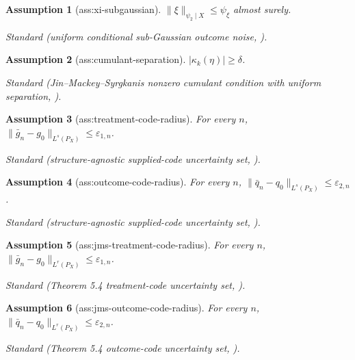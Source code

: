 \documentclass{article}
\newtheorem{assumption}{Assumption}
\begin{document}
\begin{assumption}[ass:xi-subgaussian]\label{ass:xi-subgaussian}
\(\|\xi\|_{\psi_2\mid X}\le\psi_{\xi}\) almost surely.
\par\smallskip\noindent\emph{Standard} (uniform conditional sub-Gaussian outcome noise, \cite{JinMackeySyrgkanis2025}).
\end{assumption}

\begin{assumption}[ass:cumulant-separation]\label{ass:cumulant-separation}
\(|\kappa_k(\eta)|\ge\delta\).
\par\smallskip\noindent\emph{Standard} (Jin--Mackey--Syrgkanis nonzero cumulant condition with uniform separation, \cite{JinMackeySyrgkanis2025}).
\end{assumption}

\begin{assumption}[ass:treatment-code-radius]\label{ass:treatment-code-radius}
For every \(n\), \(\|\bar g_n-g_0\|_{L^s(P_X)}\le\varepsilon_{1,n}\).
\par\smallskip\noindent\emph{Standard} (structure-agnostic supplied-code uncertainty set, \cite{JinMackeySyrgkanis2025}).
\end{assumption}

\begin{assumption}[ass:outcome-code-radius]\label{ass:outcome-code-radius}
For every \(n\), \(\|\bar q_n-q_0\|_{L^s(P_X)}\le\varepsilon_{2,n}\).
\par\smallskip\noindent\emph{Standard} (structure-agnostic supplied-code uncertainty set, \cite{JinMackeySyrgkanis2025}).
\end{assumption}

\begin{assumption}[ass:jms-treatment-code-radius]\label{ass:jms-treatment-code-radius}
For every \(n\), \(\|\bar g_n-g_0\|_{L^r(P_X)}\le\varepsilon_{1,n}\).
\par\smallskip\noindent\emph{Standard} (Theorem 5.4 treatment-code uncertainty set, \cite{JinMackeySyrgkanis2025}).
\end{assumption}

\begin{assumption}[ass:jms-outcome-code-radius]\label{ass:jms-outcome-code-radius}
For every \(n\), \(\|\bar q_n-q_0\|_{L^r(P_X)}\le\varepsilon_{2,n}\).
\par\smallskip\noindent\emph{Standard} (Theorem 5.4 outcome-code uncertainty set, \cite{JinMackeySyrgkanis2025}).
\end{assumption}
\end{document}
